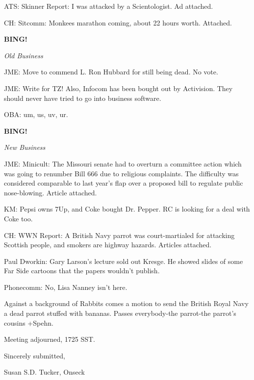 \documentclass[12pt]{article}
\newcommand{\bing}{{\bf BING!} }
\newcommand{\goto}[1]{\bing \vskip 12pt \centerline{{\em{#1}}}}
\begin{document}
ATS: Skinner Report: I was attacked by a Scientologist. Ad attached.

CH: Sitcomm: Monkees marathon coming, about 22 hours worth. Attached.

\goto{Old Business}

JME: Move to commend L. Ron Hubbard for still being dead. No vote.

JME: Write for TZ! Also, Infocom has been bought out by Activision. They should never have tried to go into business software.

OBA: um, us, uv, ur.

\goto{New Business}

JME: Minicult: The Missouri senate had to overturn a committee action which was going to renumber Bill 666 due to religious complaints. The difficulty was considered comparable to last year's flap over a proposed bill to regulate public nose-blowing. Article attached.

KM: Pepsi owns 7Up, and Coke bought Dr. Pepper. RC is looking for a deal with Coke too.

CH: WWN Report: A British Navy parrot was court-martialed for attacking Scottish people, and smokers are highway hazards. Articles attached.

Paul Dworkin: Gary Larson's lecture sold out Kresge. He showed slides of some Far Side cartoons that the papers wouldn't publish.

Phonecomm: No, Lisa Nanney isn't here.

Against a background of Rabbits comes a motion to send the British Royal Navy a dead parrot stuffed with bananas. Passes everybody-the parrot-the parrot's cousins +Spehn.

\vspace{12pt}

\noindent
Meeting adjourned, 1725 SST.

\vspace{18pt}

\centerline{Sincerely submitted,}
\centerline{Susan S.D. Tucker, Onseck}
\end{document}
